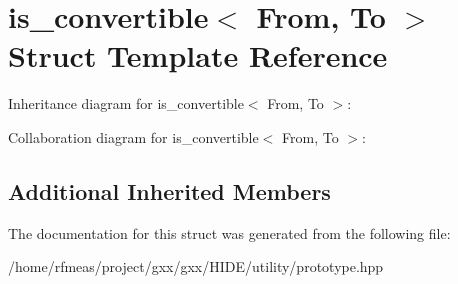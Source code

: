 \hypertarget{structis__convertible}{}\section{is\+\_\+convertible$<$ From, To $>$ Struct Template Reference}
\label{structis__convertible}


Inheritance diagram for is\+\_\+convertible$<$ From, To $>$\+:


Collaboration diagram for is\+\_\+convertible$<$ From, To $>$\+:
\subsection*{Additional Inherited Members}


The documentation for this struct was generated from the following file\+:\begin{DoxyCompactItemize}
\item 
/home/rfmeas/project/gxx/gxx/\+H\+I\+D\+E/utility/prototype.\+hpp\end{DoxyCompactItemize}
